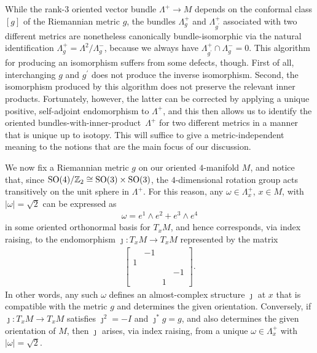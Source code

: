 \documentclass[pdftex]{sigma}
\numberwithin{equation}{section}
\def\ZZ{\mathbb{Z}}
\begin{document}
While the rank-$3$ oriented vector bundle $\Lambda^+\to M$ depends on the conformal class $[g]$ of the Riemannian metric
$g$, the bundles $\Lambda^+_g$ and $\Lambda^+_{g^\prime}$ associated with two different metrics are nonetheless canonically
bundle-isomorphic via the natural identification $\Lambda^+_g = \Lambda^2/\Lambda^-_g$,
because we always have $\Lambda_{g^\prime}^+ \cap\Lambda_g^-= 0$. This algorithm for producing an isomorphism
suffers from some defects, though. First of all, interchanging $g$ and $g^\prime$ does not produce the inverse isomorphism. Second, the isomorphism produced by this algorithm does not preserve the relevant inner products.
Fortunately, however, the latter can be corrected by applying a unique positive, self-adjoint endomorphism to $\Lambda^+$,
and this then allows us to identify the oriented bundles-with-inner-product~$\Lambda^+$ for two different metrics in a manner
that is unique up to isotopy. This will suffice to give a metric-independent meaning to the notions that are the main focus of our discussion.

We now fix a Riemannian metric $g$ on our oriented $4$-manifold $M$, and notice that, since
 ${\rm SO}(4)/\ZZ_2 \cong {\rm SO}(3)\times {\rm SO}(3)$, the $4$-dimensional rotation
 group acts transitively on the unit sphere in $\Lambda^+$. For this reason, any $\omega \in \Lambda^+_x$, $x\in M$,
 with $|\omega | = \sqrt{2}$ can be expressed as
 \begin{gather*}
\omega =e^1\wedge e^2 + e^3 \wedge e^4
\end{gather*}
 in some oriented orthonormal basis for $T_xM$, and hence corresponds, via index raising, to the
 endomorphism $\jmath\colon T_xM \to T_xM$ represented by the matrix
 \begin{gather*}
\left[\begin{array}{cccc} & -1 & & \\ 1 & & & \\ & & & -1 \\ & & 1 & \end{array}\right].
\end{gather*}
In other words, any such $\omega$ defines an almost-complex structure $\jmath$ at $x$ that is compatible with the metric
$g$ and determines the given orientation. Conversely, if $\jmath\colon T_xM\to T_xM$ satisfies
$\jmath^2 = -I$ and $\jmath^*g=g$, and also determines the given orientation of $M$, then $\jmath$ arises, via index raising,
 from a unique
$\omega \in \Lambda^+_x$ with $|\omega |= \sqrt{2}$.
\end{document}
